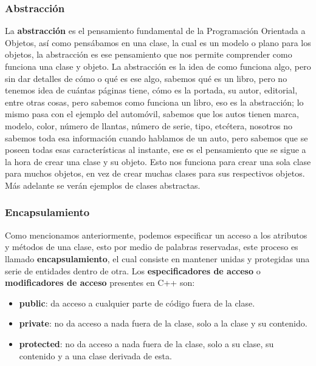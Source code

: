 \subsubsection{Abstracción}
\hspace{0.55cm}La \textbf{abstracción} es el pensamiento fundamental de la Programación Orientada a Objetos, así como pensábamos en una clase, la cual es un modelo o plano para los objetos, la abstracción es ese pensamiento que nos permite comprender como funciona una clase y objeto. La abstracción es la idea de como funciona algo, pero sin dar detalles de cómo o qué es ese algo, sabemos qué es un libro, pero no tenemos idea de cuántas páginas tiene, cómo es la portada, su autor, editorial, entre otras cosas, pero sabemos como funciona un libro, eso es la abstracción; lo mismo pasa con el ejemplo del automóvil, sabemos que los autos tienen marca, modelo, color, número de llantas, número de serie, tipo, etcétera, nosotros no sabemos toda esa información cuando hablamos de un auto, pero sabemos que se poseen todas esas características al instante, ese es el pensamiento que se sigue a la hora de crear una clase y su objeto. Esto nos funciona para crear una sola clase para muchos objetos, en vez de crear muchas clases para sus respectivos objetos. Más adelante se verán ejemplos de clases abstractas.


\subsubsection{Encapsulamiento}
\hspace{0.55cm}Como mencionamos anteriormente, podemos especificar un acceso a los atributos y métodos de una clase, esto por medio de palabras reservadas, este proceso es llamado \textbf{encapsulamiento}, el cual consiste en mantener unidas y protegidas una serie de entidades dentro de otra. Los \textbf{especificadores de acceso} o \textbf{modificadores de acceso} presentes en C++ son:
\begin{itemize}
    \item \textbf{public}: da acceso a cualquier parte de código fuera de la clase.
    \item \textbf{private}: no da acceso a nada fuera de la clase, solo a la clase y su contenido.
    \item \textbf{protected}: no da acceso a nada fuera de la clase, solo a su clase, su contenido y a una clase derivada de esta.
\end{itemize}


